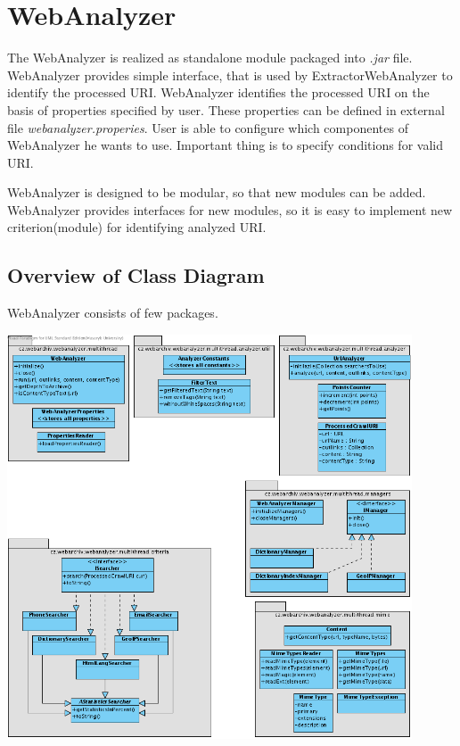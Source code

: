 \documentclass[11pt,a4paper]{article}
\begin{document}

\section{WebAnalyzer}

The WebAnalyzer is realized as standalone module packaged into \emph{.jar} file. WebAnalyzer provides simple interface, that is used by ExtractorWebAnalyzer to identify the processed URI. WebAnalyzer identifies the processed URI on the basis of properties specified by user. These properties can be defined in external file \emph{webanalyzer.properies}. User is able to configure which componentes of WebAnalyzer he wants to use. Important thing is to specify conditions for valid URI.

WebAnalyzer is designed to be modular, so that new modules can be added. WebAnalyzer provides interfaces for new modules, so it is easy to implement new criterion(module) for identifying analyzed URI.

\subsection{Overview of Class Diagram}

WebAnalyzer consists of few packages.

\begin{center}
\includegraphics[width=120mm]{webanalyzerCD.png}
\end{center}
\end{document}
